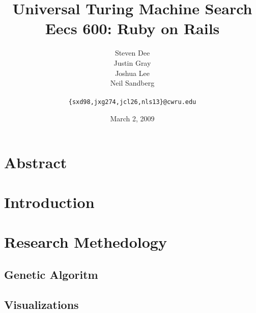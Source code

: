 \documentclass{article}
\title{Universal Turing Machine Search\\
\Large {\sc Eecs} 600: Ruby on Rails}
\author{Steven Dee \\
Justin Gray \\
Joshua Lee \\
Neil Sandberg \\
 \\
\tt \{sxd98,jxg274,jcl26,nls13\}@cwru.edu}
\date{March 2, 2009}
\begin{document}
\maketitle

\section{Abstract}



\section{Introduction}



\section{Research Methedology}
\subsection{Genetic Algoritm}


\subsection{Visualizations}






\end{document}
